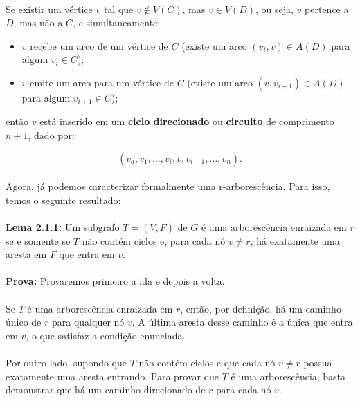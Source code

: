 \documentclass[12pt,a4paper]{article}
\begin{document}
\paragraph{}
Se existir um vértice \( v \) tal que \( v \notin V(C) \), mas \( v \in V(D) \), ou seja, \( v \) pertence a \( D \), mas não a \( C \), e simultaneamente:

\begin{itemize}
    \item \( v \) recebe um arco de um vértice de \( C \) (existe um arco \( (v_i, v) \in A(D) \) para algum \( v_i \in C \));
    \item \( v \) emite um arco para um vértice de \( C \) (existe um arco \( (v, v_{i+1}) \in A(D) \) para algum \( v_{i+1} \in C \));
\end{itemize}

então \( v \) está inserido em um \textbf{ciclo direcionado} ou \textbf{circuito} de comprimento \( n+1 \), dado por:

\[
(v_a, v_1, \ldots, v_i, v, v_{i+1}, \ldots, v_n).
\]

\paragraph{}
Agora, já podemos caracterizar formalmente uma r-arborescência. Para isso, temos o seguinte resultado:

\paragraph{}
\textbf{Lema 2.1.1:} Um subgrafo \(T = (V, F)\) de \(G\) é uma arborescência enraizada em \(r\) se e somente se \(T\) não contém ciclos e, para cada nó \(v \neq r\), há exatamente uma aresta em \(F\) que entra em \(v\).

\paragraph{}
\textbf{Prova:} Provaremos primeiro a ida e depois a volta.

\paragraph{}
Se \(T\) é uma arborescência enraizada em \(r\), então, por definição, há um caminho único de \(r\) para qualquer nó \(v\). A última aresta desse caminho é a única que entra em \(v\), o que satisfaz a condição enunciada.

\paragraph{}
Por outro lado, supondo que \(T\) não contém ciclos e que cada nó \(v \neq r\) possua exatamente uma aresta entrando. Para provar que \(T\) é uma arborescência, basta demonstrar que há um caminho direcionado de \(r\) para cada nó \(v\). 
\end{document}
